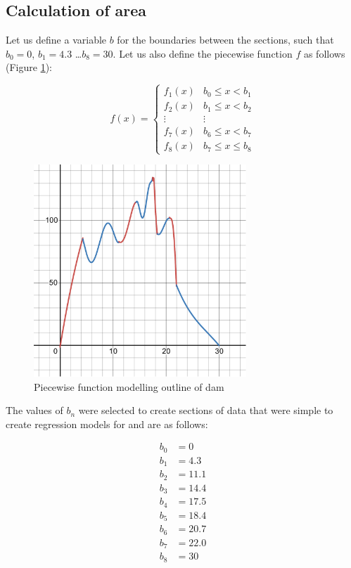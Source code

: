 \documentclass[a4paper]{article}
\theoremstyle{definition}
\begin{document}
    \subsection{Calculation of area}

        Let us define a variable $b$ for the boundaries between the sections, such that $b_0 = 0$, $b_1 = 4.3$ \ldots $b_8 = 30$. Let us also  define the piecewise function $f$ as follows (Figure \ref{figDamFunction}):

        \begin{equation} %
            f(x) = \begin{cases}
                f_1(x) & b_0 \leq x < b_1 \\
                f_2(x) & b_1 \leq x < b_2 \\
                \vdots & \vdots \\
                f_7(x) & b_6 \leq x < b_7 \\
                f_8(x) & b_7 \leq x \leq b_8
            \end{cases}
            \label{eqnPiecewiseFunction}
        \end{equation}

        \begin{figure} %
            \centering
            \includegraphics[width = 8cm]{damFunction.pdf}
            \caption{Piecewise function modelling outline of dam}
            \label{figDamFunction}
        \end{figure}

        The values of $b_n$ were selected to create sections of data that were simple to create regression models for and are as follows:

        \begin{align*} %
            b_0 &= 0 \\
            b_1 &= 4.3 \\
            b_2 &= 11.1 \\
            b_3 &= 14.4 \\
            b_4 &= 17.5 \\
            b_5 &= 18.4 \\
            b_6 &= 20.7 \\
            b_7 &= 22.0 \\
            b_8 &= 30
        \end{align*}
\end{document}
